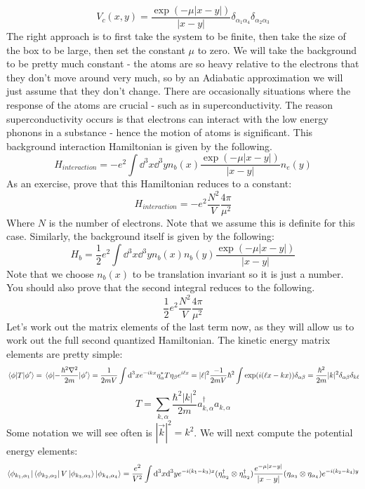 \documentclass{article}
\begin{document}
\[V_c(x,y)=\frac{\exp(-\mu|x-y|)}{|x-y|}\delta_{\alpha_1\alpha_4}\delta_{\alpha_2\alpha_3}\]
The right approach is to first take the system to be finite, then take the size of the box to be large, then set the constant $\mu$ to zero. We will take the background to be pretty much constant - the atoms are so heavy relative to the electrons that they don't move around very much, so by an Adiabatic approximation we will just assume that they don't change. There are occasionally situations where the response of the atoms are crucial - such as in superconductivity. The reason superconductivity occurs is that electrons can interact with the low energy phonons in a substance - hence the motion of atoms is significant. This background interaction Hamiltonian is given by the following.
\begin{equation}
    H_{interaction} = -e^2 \int \dd^3 x \dd^3 y  n_b(x) \frac{\exp(-\mu|x-y|)}{|x-y|}n_e(y)
\end{equation}
As an exercise, prove that this Hamiltonian reduces to a constant:
\[H_{interaction} = -e^2\frac{N^2}{V}\frac{4\pi}{\mu^2}\]
Where $N$ is the number of electrons. Note that we assume this is definite for this case. Similarly, the background itself is given by the following:
\begin{equation}
H_b = \frac{1}{2}e^2\int\dd^3 x \dd^3 y n_b(x) n_b(y)\frac{\exp(-\mu|x-y|)}{|x-y|}
\end{equation}
Note that we choose $n_b(x)$ to be translation invariant so it is just a number. You should also prove that the second integral reduces to the following.
\[\frac{1}{2}e^2 \frac{N^2}{V}\frac{4\pi}{\mu^2}\]
Let's work out the matrix elements of the last term now, as they will allow us to work out the full second quantized Hamiltonian. The kinetic energy matrix elements are pretty simple:
\[\mel{\phi}{T}{\phi'}=\mel{\phi}{-\frac{\hbar^2\nabla^2}{2m}}{\phi'} = \frac{1}{2mV}\int \dd^3 x e^{-ikx}\eta_\alpha^* T \eta_\beta e^{i\ell x} = |\ell|^2\frac{-1}{2mV}\hbar^2\int \exp(i(\ell x - kx))\delta_{\alpha \beta} = \frac{\hbar^2}{2m}|k|^2\delta_{\alpha \beta}\delta_{k \ell}\]
\begin{equation}
T =\sum_{k,\alpha} \frac{\hbar^2 |k|^2}{2m}a^\dagger_{k,\alpha}a_{k,\alpha}
\end{equation}
Some notation we will see often is $|\vec{k}|^2 = k^2$. We will next compute the potential energy elements:
\[\bra{\phi_{k_1,\alpha_1}}\bra{\phi_{k_2,\alpha_2}}V\ket{\phi_{k_3,\alpha_3}}\ket{\phi_{k_4,\alpha_4}}= \frac{e^2}{V^2}\int\dd^3 x\dd^3 y e^{-i(k_1-k_3)x}(\eta_{\alpha_2}^\dagger \otimes \eta_{\alpha_2}^\dagger)\frac{e^{-\mu|x-y|}}{|x-y|}(\eta_{\alpha_3}\otimes \eta_{\alpha_4})e^{-i(k_2-k_4)y}\]
\end{document}
